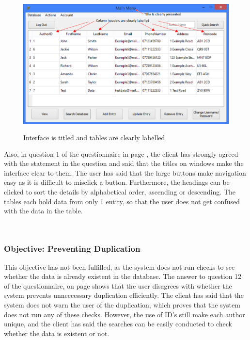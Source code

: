 \begin{figure}[H]
    \includegraphics[width=\textwidth]{./Evaluation/Evidence/Clarity.png}
    \label{fig:InterfaceClarity} \caption{Interface is titled and tables are clearly labelled}
\end{figure}

Also, in question 1 of the questionnaire in page \pageref{fig:QuestionnairePage1}, the client has strongly agreed with the statement in the question and said that the titles on windows make the interface clear to them. The user has said that the large buttons make navigation easy as it is difficult to misclick a button. Furthermore, the headings can be clicked to sort the details by alphabetical order, ascending or descending. The tables each hold data from only 1 entity, so that the user does not get confused with the data in the table.

\

\subsubsection{Objective: Preventing Duplication}

This objective has not been fulfilled, as the system does not run checks to see whether the data is already existent in the database. The answer to question 12 of the questionnaire, on page \pageref{fig:QuestionnairePage2} shows that the user disagrees with whether the system prevents unneccessary duplication efficiently. The client has said that the system does not warn the user of the duplication, which proves that the system does not run any of these checks. However, the use of ID's still make each author unique, and the client has said the searches can be easily conducted to check whether the data is existent or not. 

